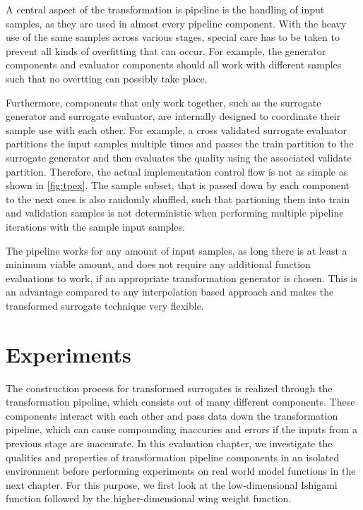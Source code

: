 \documentclass[
  a4paper,  %
  twoside,  %
  bibliography=totoc,
  headsepline,
  cleardoublepage=empty,
  parskip=half,
  draft=false
]{scrbook}
\begin{document}
A central aspect of the transformation is pipeline is the handling of input samples, as they are used in almost every pipeline component.
With the heavy use of the same samples across various stages, special care has to be taken to prevent all kinds of overfitting that can occur.
For example, the generator components and evaluator components should all work with different samples such that no overtting can possibly take place.

Furthermore, components that only work together, such as the surrogate generator and surrogate evaluator, are internally designed to coordinate their sample use with each other.
For example, a cross validated surrogate evaluator partitions the input samples multiple times and passes the train partition to the surrogate generator and then evaluates the quality using the associated validate partition.
Therefore, the actual implementation control flow is not as simple as shown in \cref{fig:tpex}.
The sample subset, that is passed down by each component to the next ones is also randomly shuffled, such that partioning them into train and validation samples is not deterministic when performing multiple pipeline iterations with the sample input samples.

The pipeline works for any amount of input samples, as long there is at least a minimum viable amount, and does not require any additional function evaluations to work, if an appropriate transformation generator is chosen.
This is an advantage compared to any interpolation based approach and makes the transformed surrogate technique very flexible.

\chapter{Experiments}
\label{chap:c7}

The construction process for transformed surrogates is realized through the transformation pipeline, which consists out of many different components.
These components interact with each other and pass data down the transformation pipeline, which can cause compounding inaccuries and errors if the inputs from a previous stage are inaccurate.
In this evaluation chapter, we investigate the qualities and properties of transformation pipeline components in an isolated environment before performing experiments on real world model functions in the next chapter.
For this purpose, we first look at the low-dimensional Ishigami function followed by the higher-dimensional wing weight function.
\end{document}
